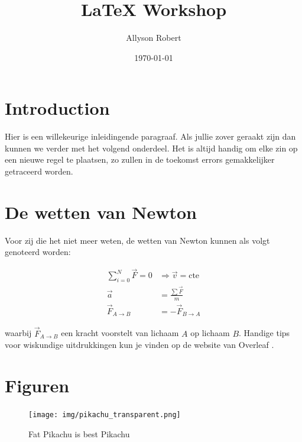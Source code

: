 \documentclass{article}
\title{LaTeX Workshop}
\author{Allyson Robert}
\date{\today}
\begin{document}
\maketitle
\tableofcontents

\section{Introduction}
\label{sec:intro}
Hier is een willekeurige inleidingende paragraaf. 
Als jullie zover geraakt zijn dan kunnen we verder met het volgend onderdeel.
Het is altijd handig om elke zin op een nieuwe regel te plaatsen, zo zullen in de toekomst errors gemakkelijker getraceerd worden.

\section{De wetten van Newton}
Voor zij die het niet meer weten, de wetten van Newton kunnen als volgt genoteerd worden:

\begin{align}
    \sum_{i=0}^{N} \vec{F} = 0 &\Rightarrow \vec{v} = \text{cte}\\
    \vec{a} &= \frac{\sum \vec{F}}{m} \\
    \vec{F}_{A\to B} &= -\vec{F}_{B \to A}
\end{align}

waarbij $\vec{F}_{A \to B}$ een kracht voorstelt van lichaam $A$ op lichaam $B$.
Handige tips voor wiskundige uitdrukkingen kun je vinden op de website van Overleaf \cite{OverleafMath}.

\section{Figuren}

\begin{figure}[H]
    \centering
    \texttt{[image: img/pikachu\_transparent.png]}
    \caption{Fat Pikachu is best Pikachu}
    \label{fig:pikachu}
\end{figure}
\end{document}
